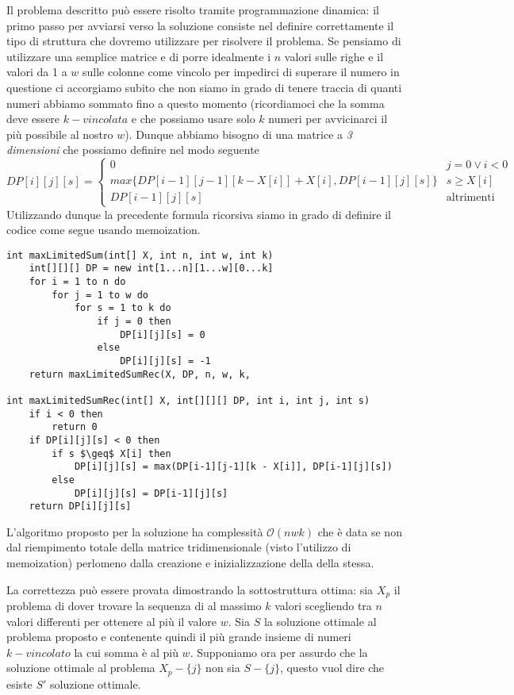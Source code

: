 \documentclass[../cheatSheetAlgoritmi.tex]{subfiles}
\begin{document}
Il problema descritto può essere risolto tramite programmazione dinamica: il primo passo per avviarsi verso la soluzione consiste nel definire correttamente il tipo di struttura che dovremo utilizzare per risolvere il problema. Se pensiamo di utilizzare una semplice matrice e di porre idealmente i $n$ valori sulle righe e il valori da 1 a $w$ sulle colonne come vincolo per impedirci di superare il numero in questione ci accorgiamo subito che non siamo in grado di tenere traccia di quanti numeri abbiamo sommato fino a questo momento (ricordiamoci che la somma deve essere $k-vincolata$ e che possiamo usare solo $k$ numeri per avvicinarci il più possibile al nostro $w$). Dunque abbiamo bisogno di una matrice a \emph{3 dimensioni} che possiamo definire nel modo seguente
\begin{equation*}
  	DP[i][j][s]=\begin{cases}
  		0 & \text{$j = 0 \lor i < 0$}\\
  		max\{DP[i-1][j-1][k - X[i]] + X[i], DP[i-1][j][s]\} &\text{$s \geq X[i]$}\\
    	DP[i-1][j][s] & \text{altrimenti}
  	\end{cases}
\end{equation*}
Utilizzando dunque la precedente formula ricorsiva siamo in grado di definire il codice come segue usando memoization.
\begin{lstlisting}[caption=Somma Massimale (k w)-vincolata]
int maxLimitedSum(int[] X, int n, int w, int k)
	int[][][] DP = new int[1...n][1...w][0...k]
	for i = 1 to n do
		for j = 1 to w do
			for s = 1 to k do
				if j = 0 then 
					DP[i][j][s] = 0
				else 
					DP[i][j][s] = -1
	return maxLimitedSumRec(X, DP, n, w, k, 

int maxLimitedSumRec(int[] X, int[][][] DP, int i, int j, int s)
	if i < 0 then
		return 0
	if DP[i][j][s] < 0 then
		if s $\geq$ X[i] then
			DP[i][j][s] = max(DP[i-1][j-1][k - X[i]], DP[i-1][j][s])
		else
			DP[i][j][s] = DP[i-1][j][s]
	return DP[i][j][s]
\end{lstlisting}
L'algoritmo proposto per la soluzione ha complessità $\mathcal{O}(nwk)$ che è data se non dal riempimento totale della matrice tridimensionale (visto l'utilizzo di memoization) perlomeno dalla creazione e inizializzazione della della stessa.

La correttezza può essere provata dimostrando la sottostruttura ottima: sia $X_{p}$ il problema di dover trovare la sequenza di al massimo $k$ valori scegliendo tra $n$ valori differenti per ottenere al più il valore $w$. Sia $S$ la soluzione ottimale al problema proposto e contenente quindi il più grande insieme di numeri $k-vincolato$ la cui somma è al più $w$. Supponiamo ora per assurdo che la soluzione ottimale al problema $X_{p} - \{j\}$ non sia $S - \{j\}$, questo vuol dire che esiste $S'$ soluzione ottimale.
\end{document}

